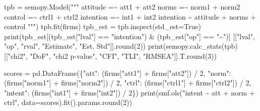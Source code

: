 \documentclass[
  letterpaper,
  10pt,
  twoside,
  openright,
  numbers=noenddot,
  chapterprefix=true]{scrbook}
\newenvironment{Shaded}{}{}
\newcommand{\BuiltInTok}[1]{\textcolor[rgb]{0.84,0.23,0.29}{#1}}
\newcommand{\DecValTok}[1]{\textcolor[rgb]{0.00,0.36,0.77}{#1}}
\newcommand{\NormalTok}[1]{\textcolor[rgb]{0.14,0.16,0.18}{#1}}
\newcommand{\OperatorTok}[1]{\textcolor[rgb]{0.14,0.16,0.18}{#1}}
\newcommand{\StringTok}[1]{\textcolor[rgb]{0.01,0.18,0.38}{#1}}
\newcommand{\VariableTok}[1]{\textcolor[rgb]{0.89,0.38,0.04}{#1}}
\begin{document}
\begin{Shaded}
\begin{Highlighting}[]
\NormalTok{tpb }\OperatorTok{=}\NormalTok{ semopy.Model(}\StringTok{"""}
\StringTok{attitude  =\textasciitilde{} att1 + att2}
\StringTok{norms     =\textasciitilde{} norm1 + norm2}
\StringTok{control   =\textasciitilde{} ctrl1 + ctrl2}
\StringTok{intention =\textasciitilde{} int1 + int2}
\StringTok{intention \textasciitilde{} attitude + norms + control}
\StringTok{"""}\NormalTok{)}
\NormalTok{tpb.fit(firms)}
\NormalTok{tpb\_est }\OperatorTok{=}\NormalTok{ tpb.inspect(std\_est}\OperatorTok{=}\VariableTok{True}\NormalTok{)}
\BuiltInTok{print}\NormalTok{(tpb\_est[(tpb\_est[}\StringTok{"lval"}\NormalTok{] }\OperatorTok{==} \StringTok{"intention"}\NormalTok{) }\OperatorTok{\&}\NormalTok{ (tpb\_est[}\StringTok{"op"}\NormalTok{] }\OperatorTok{==} \StringTok{"\textasciitilde{}"}\NormalTok{)]}
\NormalTok{      [[}\StringTok{"lval"}\NormalTok{, }\StringTok{"op"}\NormalTok{, }\StringTok{"rval"}\NormalTok{, }\StringTok{"Estimate"}\NormalTok{, }\StringTok{"Est. Std"}\NormalTok{]].}\BuiltInTok{round}\NormalTok{(}\DecValTok{2}\NormalTok{))}
\BuiltInTok{print}\NormalTok{(semopy.calc\_stats(tpb)[[}\StringTok{"chi2"}\NormalTok{, }\StringTok{"DoF"}\NormalTok{, }\StringTok{"chi2 p{-}value"}\NormalTok{, }\StringTok{"CFI"}\NormalTok{, }\StringTok{"TLI"}\NormalTok{, }\StringTok{"RMSEA"}\NormalTok{]].T.}\BuiltInTok{round}\NormalTok{(}\DecValTok{3}\NormalTok{))}

\NormalTok{scores }\OperatorTok{=}\NormalTok{ pd.DataFrame(\{}\StringTok{"att"}\NormalTok{: (firms[}\StringTok{"att1"}\NormalTok{] }\OperatorTok{+}\NormalTok{ firms[}\StringTok{"att2"}\NormalTok{]) }\OperatorTok{/} \DecValTok{2}\NormalTok{,}
                       \StringTok{"norm"}\NormalTok{: (firms[}\StringTok{"norm1"}\NormalTok{] }\OperatorTok{+}\NormalTok{ firms[}\StringTok{"norm2"}\NormalTok{]) }\OperatorTok{/} \DecValTok{2}\NormalTok{,}
                       \StringTok{"ctrl"}\NormalTok{: (firms[}\StringTok{"ctrl1"}\NormalTok{] }\OperatorTok{+}\NormalTok{ firms[}\StringTok{"ctrl2"}\NormalTok{]) }\OperatorTok{/} \DecValTok{2}\NormalTok{,}
                       \StringTok{"intent"}\NormalTok{: (firms[}\StringTok{"int1"}\NormalTok{] }\OperatorTok{+}\NormalTok{ firms[}\StringTok{"int2"}\NormalTok{]) }\OperatorTok{/} \DecValTok{2}\NormalTok{\})}
\BuiltInTok{print}\NormalTok{(smf.ols(}\StringTok{"intent \textasciitilde{} att + norm + ctrl"}\NormalTok{, data}\OperatorTok{=}\NormalTok{scores).fit().params.}\BuiltInTok{round}\NormalTok{(}\DecValTok{2}\NormalTok{))}
\end{Highlighting}
\end{Shaded}
\end{document}
